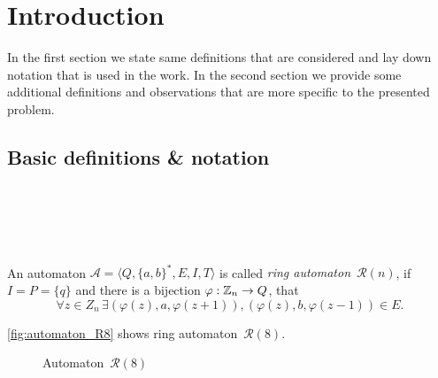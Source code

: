 \chapter{Introduction}

In the first section we state same definitions that are considered and lay down notation that is used in the work. In the second section we provide some additional definitions and observations that are more specific to the presented problem.

\section{Basic definitions \& notation}

\begin{defn} \\
    \\
    \\
\end{defn}

\section{}

\begin{defn}
    An automaton $\mathcal{A} = \langle Q, {\{a,b\}}^*, E, I, T \rangle$ is called \emph{ring automaton~${\mathcal{R}(n)}$}, if $I = P = \{q\}$ and there is a bijection $\varphi: \mathbb{Z}_n \to Q$, that
    \[
        \forall z \in Z_n \, \exists (\varphi(z),a,\varphi(z+1)), (\varphi(z),b,\varphi(z-1)) \in E.
    \]
\end{defn}

\begin{example}
    \autoref*{fig:automaton_R8} shows ring automaton~${\mathcal{R}(8)}$.
\end{example}

\begin{figure}[h]
    \centering
    
    \caption{Automaton~${\mathcal{R}(8)}$}\label{fig:automaton_R8}
\end{figure}